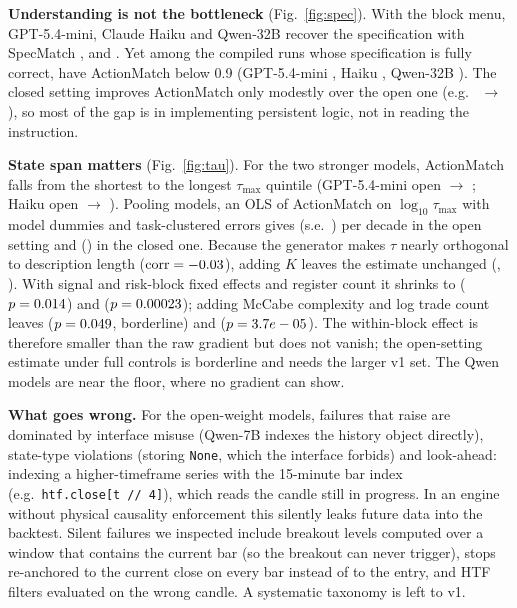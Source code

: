\documentclass[sigconf,nonacm]{acmart}
\begin{document}
\begin{table}[t]\centering\scriptsize\setlength{\tabcolsep}{3pt}
\caption{Same \NSub{} tasks (40 per $\tau_{\max}$ quintile), open setting. ActionMatch and the
quintile columns are over compiled runs; Exact and Silent are shares of all tasks.}
\label{tab:frontier}

\end{table}

\textbf{Understanding is not the bottleneck} (Fig.~\ref{fig:spec}). With the block menu, GPT-5.4-mini,
Claude Haiku and Qwen-32B recover the specification with SpecMatch \SpecMatchGptClosed,
\SpecMatchHaikuClosed{} and \SpecMatchQwenLClosed. Yet among the \NSpecOne{} compiled runs whose
specification is fully correct, \SpecOneBehaviourWrong{} have ActionMatch below 0.9
(GPT-5.4-mini \SpecOneWrongGpt, Haiku \SpecOneWrongHaiku, Qwen-32B \SpecOneWrongQwenL). The closed
setting improves ActionMatch only modestly over the open one (e.g.\ \ActionMatchGptOpen{} $\to$
\ActionMatchGptClosed), so most of the gap is in implementing persistent logic, not in reading
the instruction.

\textbf{State span matters} (Fig.~\ref{fig:tau}). For the two stronger models, ActionMatch falls
from the shortest to the longest $\tau_{\max}$ quintile (GPT-5.4-mini open \AMQoneGptOpen{} $\to$
\AMQfiveGptOpen; Haiku open \AMQoneHaikuOpen{} $\to$ \AMQfiveHaikuOpen). Pooling models, an OLS of
ActionMatch on $\log_{10}\tau_{\max}$ with model dummies and task-clustered errors gives
\RegOpenTauOnlyTau{} (s.e.\ \RegOpenTauOnlyTauSE) per decade in the open setting and
\RegClosedTauOnlyTau{} (\RegClosedTauOnlyTauSE) in the closed one. Because the generator makes
$\tau$ nearly orthogonal to description length ($\mathrm{corr}=-0.03$), adding $K$ leaves the
estimate unchanged (\RegOpenTauKTau, \RegClosedTauKTau). With signal and risk-block fixed effects and
register count it shrinks to \RegOpenTauKFeTau{} ($p=0.014$) and \RegClosedTauKFeTau{}
($p=0.00023$); adding McCabe complexity and log trade count leaves \RegOpenTauKFeControlsTau{}
($p=0.049$, borderline) and \RegClosedTauKFeControlsTau{}
($p=3.7e-05$). The within-block effect is therefore smaller than the raw
gradient but does not vanish; the open-setting estimate under full controls is borderline and
needs the larger v1 set. The Qwen models are near the floor, where no gradient can show.

\textbf{What goes wrong.} For the open-weight models, failures that raise are dominated by
interface misuse (Qwen-7B indexes the history object directly), state-type violations (storing
\texttt{None}, which the interface forbids) and look-ahead: indexing a higher-timeframe series
with the 15-minute bar index (e.g.\ \texttt{htf.close[t // 4]}), which reads the candle still in
progress. In an engine without physical causality enforcement this silently leaks future data
into the backtest. Silent failures we inspected include breakout levels computed over a window that
contains the current bar (so the breakout can never trigger), stops re-anchored to the current
close on every bar instead of to the entry, and HTF filters evaluated on the wrong candle. A
systematic taxonomy is left to v1.
\end{document}

